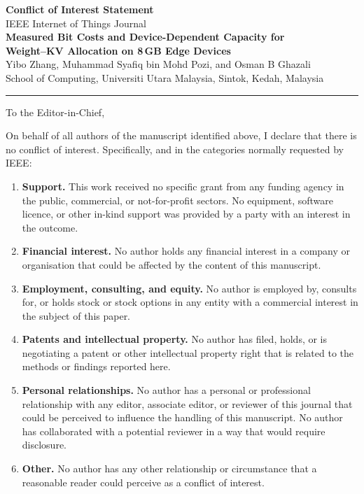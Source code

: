 \documentclass[10pt]{article}
\begin{document}
\begin{center}
{\Large\bfseries Conflict of Interest Statement}\\[6pt]
{\large IEEE Internet of Things Journal}\\[10pt]
{\bfseries Measured Bit Costs and Device-Dependent Capacity for\\
Weight--KV Allocation on 8\,GB Edge Devices}\\[8pt]
Yibo Zhang, Muhammad Syafiq bin Mohd Pozi, and Osman B Ghazali\\
School of Computing, Universiti Utara Malaysia, Sintok, Kedah, Malaysia
\end{center}

\vspace{6pt}
\hrule
\vspace{12pt}

To the Editor-in-Chief,

On behalf of all authors of the manuscript identified above, I declare that
there is no conflict of interest. Specifically, and in the categories normally
requested by IEEE:

\begin{enumerate}
  \item \textbf{Support.} This work received no specific grant from any funding
  agency in the public, commercial, or not-for-profit sectors. No equipment,
  software licence, or other in-kind support was provided by a party with an
  interest in the outcome.
  \item \textbf{Financial interest.} No author holds any financial interest in
  a company or organisation that could be affected by the content of this
  manuscript.
  \item \textbf{Employment, consulting, and equity.} No author is employed by,
  consults for, or holds stock or stock options in any entity with a commercial
  interest in the subject of this paper.
  \item \textbf{Patents and intellectual property.} No author has filed, holds,
  or is negotiating a patent or other intellectual property right that is
  related to the methods or findings reported here.
  \item \textbf{Personal relationships.} No author has a personal or
  professional relationship with any editor, associate editor, or reviewer of
  this journal that could be perceived to influence the handling of this
  manuscript. No author has collaborated with a potential reviewer in a way
  that would require disclosure.
  \item \textbf{Other.} No author has any other relationship or circumstance
  that a reasonable reader could perceive as a conflict of interest.
\end{enumerate}
\end{document}
